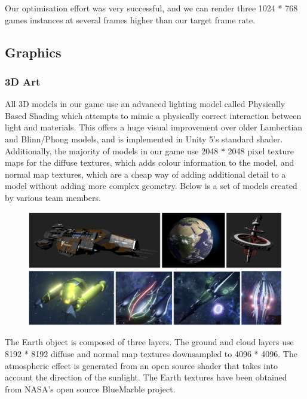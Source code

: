 \documentclass[a4paper,11pt]{article}
\begin{document}
Our optimisation effort was very successful, and we can render three 1024 * 768 games instances at several frames higher than our target frame rate.

\subsection{Graphics}

\subsubsection{3D Art}
All 3D models in our game use an advanced lighting model called Physically Based Shading which attempts to mimic a physically correct interaction between light and materials. This offers a huge visual improvement over older Lambertian and Blinn/Phong models, and is implemented in Unity 5’s standard shader.  Additionally, the majority of models in our game use 2048 * 2048 pixel texture maps for the diffuse textures, which adds colour information to the model, and normal map textures, which are a cheap way of adding additional detail to a model without adding more complex geometry. Below is a set of models created by various team members.

\begin{figure}[ht]
	\centering
	\includegraphics[width=\textwidth]{images/3DArt}
\end{figure}

The Earth object is composed of three layers. The ground and cloud layers use 8192 * 8192 diffuse and normal map textures downsampled to 4096 * 4096. The atmospheric effect is generated from an open source shader that takes into account the direction of the sunlight. The Earth textures have been obtained from NASA’s open source BlueMarble project.
\end{document}
